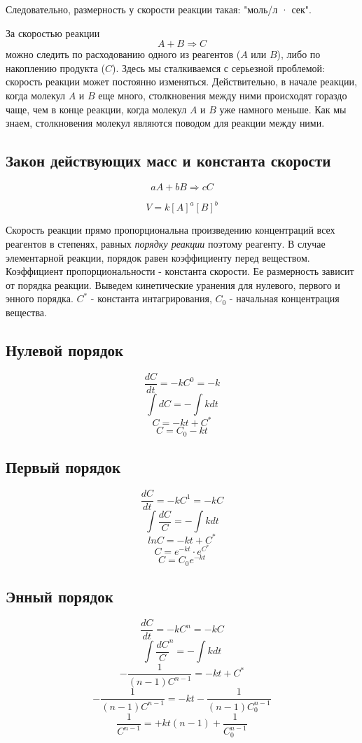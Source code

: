 \documentclass[14pt,a4paper]{scrartcl}
\begin{document}
Следовательно, размерность у скорости реакции такая: "моль/л · сек".

За скоростью реакции $$A + B \Rightarrow C$$ можно следить по расходованию одного из реагентов ($A$ или $B$), либо по накоплению продукта ($C$). Здесь мы сталкиваемся с серьезной проблемой: скорость реакции может постоянно изменяться. Действительно, в начале реакции, когда молекул $A$ и $B$ еще много, столкновения между ними происходят гораздо чаще, чем в конце реакции, когда молекул $A$ и $B$ уже намного меньше. Как мы знаем, столкновения молекул являются поводом для реакции между ними. 

\subsection*{Закон действующих масс и константа скорости} 

$$aA + bB \Rightarrow cC$$

$$V = k \left[A\right]^a\left[B\right]^b$$


Скорость реакции прямо пропорциональна произведению концентраций всех реагентов в степенях, равных \emph{порядку реакции} поэтому реагенту. В случае элементарной реакции, порядок равен коэффициенту перед веществом. Коэффициент пропорциональности - константа скорости. Ее размерность зависит от порядка реакции. Выведем кинетические уранения для нулевого, первого и энного порядка. $C^*$ - константа интагрирования, $C_0$ - начальная концентрация вещества. 

\subsection*{Нулевой порядок}
$$\frac{dC}{dt} = -kC^0 = -k$$
$$\int dC = -\int kdt$$
$$C = -kt + C^*$$
$$C = C_0 - kt$$

\subsection*{Первый порядок}
$$\frac{dC}{dt} = -kC^1 = -kC$$
$$\int \frac{dC}C = -\int kdt$$
$$ln C = -kt + C^*$$
$$C = e^{-kt}\cdot e^{C^*}$$
$$C = C_0e^{-kt}$$

\subsection*{Энный порядок}
$$\frac{dC}{dt} = -kC^n = -kC$$
$$\int \frac{dC}C^n = -\int kdt$$
$$-\frac{1}{(n-1)C^{n-1}} = -kt + C^*$$
$$-\frac{1}{(n-1)C^{n-1}} = -kt - \frac{1}{(n-1)C_0^{n-1}}$$
$$ \frac 1{C^{n-1}} = +kt(n-1) + \frac1{C_0^{n-1}}$$
\end{document}
